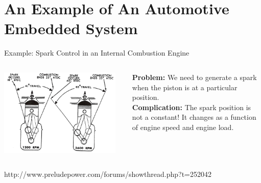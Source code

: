\documentclass[aspectratio=169]{beamer}
\begin{document}
	
	
\section{An Example of An Automotive Embedded System}	
	
	
  
	\begin{frame}{Example: Spark Control in an Internal Combustion Engine}
	\vspace{1em}
	\begin{columns}
	\begin{column}{0.6\textwidth}
	\includegraphics[width=0.95\textwidth,keepaspectratio]{img/LeanAdvance.png}
	\end{column}
	\begin{column}{0.4\textwidth}
	\textbf{Problem:} We need to generate a spark when the piston is at a particular position. \\
	\vspace{1em}
	\textbf{Complication:} The spark position is not a constant! It changes as a function of engine speed and engine load.
	\end{column}
	\end{columns}
	\vspace{1em}
	\begin{footnotesize}http://www.preludepower.com/forums/showthread.php?t=252042\end{footnotesize}
	\end{frame}	  
  
\end{document}
